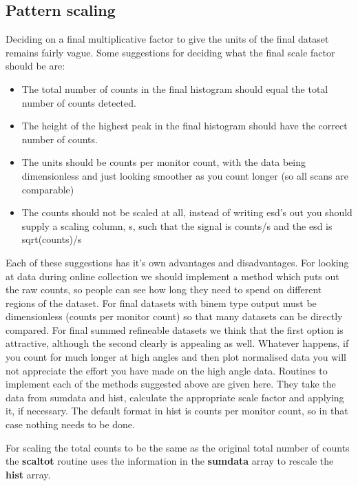 \documentclass[10pt,a4paper,notitlepage]{article}
\newcommand{\var}[1]{\textbf{\textsf{#1}}} %
\newcommand{\code}[1]{\textbf{\textsf{#1}}} %
\begin{document}
\subsection{Pattern scaling}
Deciding on a final multiplicative factor to give the units
of the final dataset remains fairly vague. 
Some suggestions for deciding what the final scale factor should be
are:
\begin{itemize}
\item The total number of counts in the final histogram should equal the
total number of counts detected.
\item The height of the highest peak in the final histogram should 
have the correct number of counts.
\item The units should be counts per monitor count, with the data being
dimensionless and just looking smoother as you count longer (so all scans
are comparable)
\item The counts should not be scaled at all, instead of writing esd's out you
should supply a scaling column, s, such that the signal is counts/s and the 
esd is sqrt(counts)/s
\end{itemize}

Each of these suggestions has it's own advantages and disadvantages.
For looking at data during online collection we should implement a method
which puts out the raw counts, so people can see how long they need to spend
on different regions of the dataset.
For final datasets with binem type output must be dimensionless (counts per 
monitor count) so that many datasets can be directly compared.
For final summed refineable datasets we think that the first option
is attractive, although the second clearly is appealing as well. 
Whatever happens, if you count for much longer at high angles and then
plot normalised data you will not appreciate the effort you have made on
the high angle data.
Routines to implement each of the methods suggested above are given here. 
They take the data from sumdata and hist, calculate the appropriate scale 
factor and applying it, if necessary. 
The default format in hist is counts per monitor count, so in that case
nothing needs to be done.

For scaling the total counts to be the same as the original total
number of counts the \code{scaltot} routine uses the information in
the \var{sumdata} array to rescale the \var{hist} array.
\end{document}
